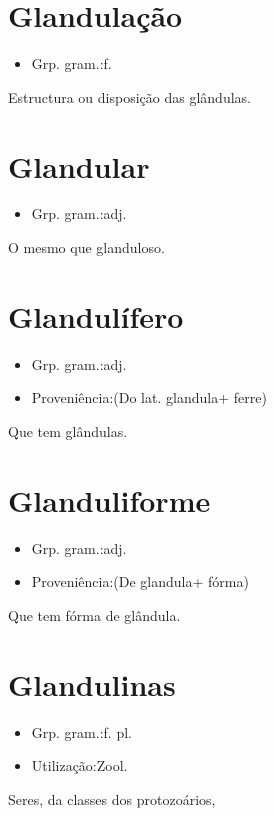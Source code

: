 \section{Glandulação}
\begin{itemize}
\item {Grp. gram.:f.}
\end{itemize}
Estructura ou disposição das glândulas.
\section{Glandular}
\begin{itemize}
\item {Grp. gram.:adj.}
\end{itemize}
O mesmo que \textunderscore glanduloso\textunderscore .
\section{Glandulífero}
\begin{itemize}
\item {Grp. gram.:adj.}
\end{itemize}
\begin{itemize}
\item {Proveniência:(Do lat. \textunderscore glandula\textunderscore  + \textunderscore ferre\textunderscore )}
\end{itemize}
Que tem glândulas.
\section{Glanduliforme}
\begin{itemize}
\item {Grp. gram.:adj.}
\end{itemize}
\begin{itemize}
\item {Proveniência:(De \textunderscore glandula\textunderscore  + \textunderscore fórma\textunderscore )}
\end{itemize}
Que tem fórma de glândula.
\section{Glandulinas}
\begin{itemize}
\item {Grp. gram.:f. pl.}
\end{itemize}
\begin{itemize}
\item {Utilização:Zool.}
\end{itemize}
Seres, da classes dos protozoários,
